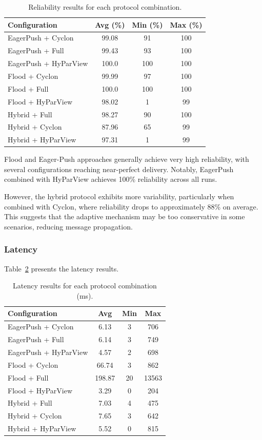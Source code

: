 \documentclass[sigconf,a4paper]{acmart}
\begin{document}
\begin{table}[h]
\centering
\caption{Reliability results for each protocol combination.}
\label{tab:reliability}
\begin{tabular}{lccc}
\toprule
Configuration & Avg (\%) & Min (\%) & Max (\%) \\
\midrule
EagerPush + Cyclon & 99.08 & 91 & 100 \\
EagerPush + Full & 99.43 & 93 & 100 \\
EagerPush + HyParView & 100.0 & 100 & 100 \\
Flood + Cyclon & 99.99 & 97 & 100 \\
Flood + Full & 100.0 & 100 & 100 \\
Flood + HyParView & 98.02 & 1 & 99 \\
Hybrid + Full & 98.27 & 90 & 100 \\
Hybrid + Cyclon & 87.96 & 65 & 99 \\
Hybrid + HyParView & 97.31 & 1 & 99 \\
\bottomrule
\end{tabular}
\end{table}

Flood and Eager-Push approaches generally achieve very high reliability,
with several configurations reaching near-perfect delivery. Notably,
EagerPush combined with HyParView achieves 100\% reliability across all
runs.

However, the hybrid protocol exhibits more variability, particularly when
combined with Cyclon, where reliability drops to approximately 88\% on
average. This suggests that the adaptive mechanism may be too conservative
in some scenarios, reducing message propagation.

\subsubsection{Latency}

Table~\ref{tab:latency} presents the latency results.

\begin{table}[h]
\centering
\caption{Latency results for each protocol combination (ms).}
\label{tab:latency}
\begin{tabular}{lccc}
\toprule
Configuration & Avg & Min & Max \\
\midrule
EagerPush + Cyclon & 6.13 & 3 & 706 \\
EagerPush + Full & 6.14 & 3 & 749 \\
EagerPush + HyParView & 4.57 & 2 & 698 \\
Flood + Cyclon & 66.74 & 3 & 862 \\
Flood + Full & 198.87 & 20 & 13563 \\
Flood + HyParView & 3.29 & 0 & 204 \\
Hybrid + Full & 7.03 & 4 & 475 \\
Hybrid + Cyclon & 7.65 & 3 & 642 \\
Hybrid + HyParView & 5.52 & 0 & 815 \\
\bottomrule
\end{tabular}
\end{table}
\end{document}
